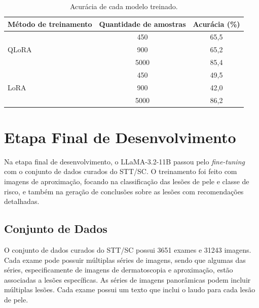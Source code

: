 \begin{table}[ht]
    \caption{\small Acurácia de cada modelo treinado.}
    \centering
    \begin{tabular}{l|c|c}
        \hline
        Método de treinamento       & Quantidade de amostras & Acurácia (\%) \\ \hline
        \multirow{3}{*}{\ac{QLoRA}} & 450                    & 65,5          \\
                                    & 900                    & 65,2          \\
                                    & 5000                   & 85,4          \\ \hline
        \multirow{3}{*}{\ac{LoRA}}  & 450                    & 49,5          \\
                                    & 900                    & 42,0          \\
                                    & 5000                   & 86,2          \\ \hline
    \end{tabular}
    \label{tab:training_accuracies}
\end{table}

\clearpage

\section{Etapa Final de Desenvolvimento}

Na etapa final de desenvolvimento, o \ac{LLaMA}-3.2-11B passou pelo \textit{fine-tuning} com o conjunto de dados
curados do \ac{STT/SC}. O treinamento foi feito com imagens de aproximação, focando na classificação das lesões de pele
e classe de risco, e também na geração de conclusões sobre as lesões com recomendações detalhadas.

\subsection{Conjunto de Dados}

O conjunto de dados curados do \ac{STT/SC} possui 3651 exames e 31243 imagens. Cada exame pode possuir múltiplas séries
de imagens, sendo que algumas das séries, especificamente de imagens de dermatoscopia e aproximação, estão associadas a
lesões específicas. As séries de imagens panorâmicas podem incluir múltiplas lesões. Cada exame possui um texto que
inclui o laudo para cada lesão de pele.

